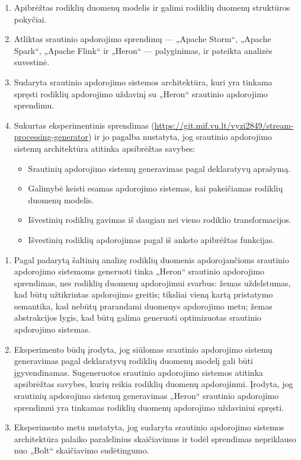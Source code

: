\documentclass{VUMIFPSbakalaurinis}
\begin{document}
\begin{enumerate}
    \item Apibrėžtas rodiklių duomenų modelis ir galimi rodiklių duomenų struktūros pokyčiai.
    \item Atliktas srautinio apdorojimo sprendimų — „Apache Storm“, „Apache Spark“, „Apache Flink“ ir „Heron“ — palyginimas, ir pateikta analizės suvestinė. 
    \item Sudaryta srautinio apdorojimo sistemos architektūra, kuri yra tinkama spręsti rodiklių apdorojimo uždavinį su „Heron“ srautinio apdorojimo sprendimu. 
    \item Sukurtas eksperimentinis sprendimas (\url{https://git.mif.vu.lt/vyzi2849/stream-processing-generator}) ir jo pagalba nustatyta, jog srautinio apdorojimo sistemų architektūra atitinka apsibrėžtas savybes:
    \begin{itemize}
        \item Srautinių apdorojimo sistemų generavimas pagal deklaratyvų aprašymą.
        \item Galimybė keisti esamas apdorojimo sistemas, kai pakeičiamas rodiklių duomenų modelis.
        \item Išvestinių rodiklių gavimas iš daugiau nei vieno rodiklio transformacijos.
        \item Išvestinių rodiklių apdorojimas pagal iš anksto apibrėžtas funkcijas.
    \end{itemize}  
    
\end{enumerate}

\begin{enumerate}
    \item Pagal padarytą šaltinių analizę rodiklių duomenis apdorojančioms srautinio apdorojimo sistemoms generuoti tinka „Heron“ srautinio apdorojimo sprendimas, nes rodiklių duomenų apdorojimui svarbus: žemas uždelstumas, kad būtų užtikrintas apdorojimo greitis; tiksliai vieną kartą pristatymo semantika, kad nebūtų prarandami duomenys apdorojimo metu; žemas abstrakcijos lygis, kad būtų galima generuoti optimizuotas srautinio apdorojimo sistemas.
    \item Eksperimento būdų įrodyta, jog siūlomas srautinio apdorojimo sistemų generavimas pagal deklaratyvų rodiklių duomenų modelį gali būti įgyvendinamas. Sugeneruotos srautinio apdorojimo sistemos atitinka apsibrėžtas savybes, kurių reikia rodiklių duomenų apdorojimui. Įrodyta, jog srautinių apdorojimo sistemų generavimas „Heron“ srautinio apdorojimo sprendimui yra tinkamas rodiklių duomenų apdorojimo uždaviniui spręsti.  
    \item Eksperimento metu nustatyta, jog sudaryta srautinio apdorojimo sistemos architektūra palaiko paralelinius skaičiavimus ir todėl sprendimas nepriklauso nuo „Bolt“ skaičiavimo sudėtingumo.
\end{enumerate}
\end{document}
